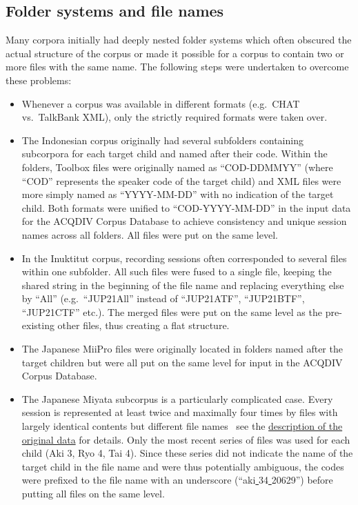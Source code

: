 \documentclass[a4paper, 11pt]{book}
\newcommand{\und}{\underline{{ }}\hspace{0.2mm}}	%
\begin{document}
\subsection{Folder systems and file names}

Many corpora initially had deeply nested folder systems which often obscured the actual structure of the corpus or made it possible for a corpus to contain two or more files with the same name. The following steps were undertaken to overcome these problems:

\begin{itemize}
	\item Whenever a corpus was available in different formats (e.g.\ CHAT vs.\ TalkBank XML), only the strictly required formats were taken over. 
	\item The Indonesian corpus originally had several subfolders containing subcorpora for each target child and named after their code. Within the folders, Toolbox files were originally named as “COD-DDMMYY” (where “COD” represents the speaker code of the target child) and XML files were more simply named as “YYYY-MM-DD” with no indication of the target child. Both formats were unified to “COD-YYYY-MM-DD” in the input data for the ACQDIV Corpus Database to achieve consistency and unique session names across all folders. All files were put on the same level. 
	\item In the Inuktitut corpus, recording sessions often corresponded to several files within one subfolder. All such files were fused to a single file, keeping the shared string in the beginning of the file name and replacing everything else by “All” (e.g.\ “JUP21All” instead of “JUP21ATF”, “JUP21BTF”, “JUP21CTF” etc.). The merged files were put on the same level as the pre-existing other files, thus creating a flat structure. 
	\item The Japanese MiiPro files were originally located in folders named after the target children but were all put on the same level for input in the ACQDIV Corpus Database. 
	\item The Japanese Miyata subcorpus is a particularly complicated case. Every session is represented at least twice and maximally four times by files with largely identical contents but different file names \textendash\ see the \hyperref[subsec:Miyata file system and formats]{description of the original data} for details. Only the most recent series of files was used for each child (Aki 3, Ryo 4, Tai 4). Since these series did not indicate the name of the target child in the file name and were thus potentially ambiguous, the codes were prefixed to the file name with an underscore (“aki\und 34\und 20629”) before putting all files on the same level. 

\end{itemize}
\end{document}
